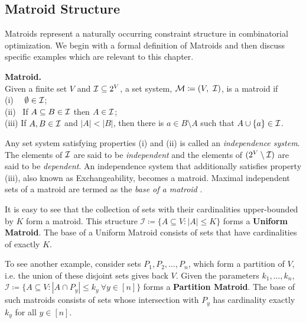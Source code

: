 \subsection{Matroid Structure}
Matroids represent a naturally occurring constraint structure in combinatorial optimization. We begin with a formal definition of Matroids and then discuss specific examples which are relevant to this chapter.
\begin{definitionBox}
    \begin{definition}{\textbf{Matroid.}}\\
        Given a finite set $V$ and $\mathcal{I}\subseteq 2^V$, a set system, $\mathcal{M}\coloneqq (V, \ \mathcal{I})$, is a matroid if\\
        (i) \ \ $\emptyset\in \mathcal{I}$;\\
        (ii) \ If $A\subseteq B\in \mathcal{I}$ then $A\in \mathcal{I}$;\\
        (iii) If $A, B\in \mathcal{I}$ and $|A|<|B|$, then there is $a \in B\setminus A$ such that $A\cup \{a\} \in \mathcal{I}$.
    \end{definition}
\end{definitionBox}
Any set system satisfying properties (i) and (ii) is called an \textit{independence system}. The elements of $\mathcal{I}$ are said to be  \textit{independent} and the elements of $(2^V\setminus \mathcal{I})$ are said to be \textit{dependent}. An independence system that additionally satisfies property (iii), also known as Exchangeability, becomes a matroid. Maximal independent sets of a matroid are termed as the \textit{base of a matroid} \citep[Chapter 13]{matroid-korte12}.

It is easy to see that the collection of sets with their cardinalities upper-bounded by $K$ form a matroid. This structure $\mathcal{I}\coloneqq\{A\subseteq V: |A|\leq K\}$ forms a \textbf{Uniform Matroid}. The base of a Uniform Matroid consists of sets that have cardinalities of exactly $K$. 

To see another example, consider sets $P_1, P_2, \ldots, P_n$, which form a partition of $V$, i.e. the union of these disjoint sets gives back $V$. Given the parameters $k_1, \ldots, k_n$, $\mathcal{I}\coloneqq \{A\subseteq V: |A\cap P_y|\leq k_y\ \forall y\in [n]\}$ forms a \textbf{Partition Matroid}. The base of such matroids consists of sets whose intersection with $P_y$ has cardinality exactly $k_y$ for all $y\in [n]$.

